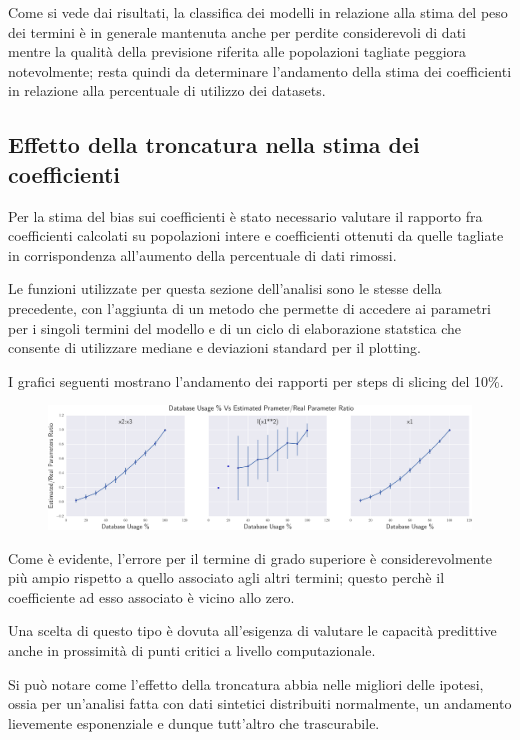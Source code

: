 \documentclass[a4paper]{report}
\begin{document}
Come si vede dai risultati, la classifica dei modelli in relazione alla stima del peso dei termini è in generale mantenuta anche per perdite considerevoli di dati mentre la qualità della previsione riferita alle popolazioni tagliate peggiora notevolmente; resta quindi da determinare l'andamento della stima dei coefficienti in relazione alla percentuale di utilizzo dei datasets.

\subsection{Effetto della troncatura nella stima dei coefficienti }
Per la stima del bias sui coefficienti è stato necessario valutare il rapporto fra coefficienti calcolati su popolazioni intere e coefficienti ottenuti da quelle  tagliate in corrispondenza all'aumento della percentuale di dati rimossi.

 Le funzioni utilizzate per questa sezione dell'analisi sono le stesse della precedente, con l'aggiunta di un metodo che permette di accedere ai parametri per i singoli termini del modello e di un ciclo di elaborazione statstica che consente  di utilizzare mediane e deviazioni standard per il plotting.

I grafici seguenti mostrano l'andamento dei rapporti per steps di slicing del 10\%.
\begin{figure}[hbtp]
\includegraphics[width=\textwidth]{finalgraph}
\end{figure}

Come è evidente, l'errore per il termine di grado superiore è considerevolmente più ampio rispetto a quello associato agli altri termini; questo perchè il coefficiente ad esso associato è vicino allo zero.

Una scelta di questo tipo è dovuta all'esigenza di valutare le capacità predittive anche in prossimità di punti critici a livello computazionale.

Si può notare come l'effetto della troncatura abbia nelle migliori delle ipotesi, ossia per un'analisi fatta con dati sintetici distribuiti normalmente, un andamento lievemente esponenziale e dunque tutt'altro che trascurabile.
\end{document}
